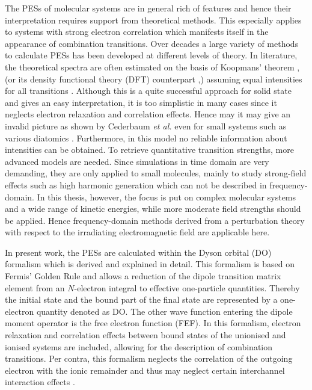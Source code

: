 The PESs of molecular systems are in general rich of features and hence their interpretation requires support from theoretical methods.
This especially applies to systems with strong electron correlation which manifests itself in the appearance of combination transitions.
Over decades a large variety of methods to calculate PESs has been developed at different levels of theory.
In literature, the theoretical spectra are often estimated on the basis of Koopmans' theorem \cite{koopmans}, (or its density functional theory (DFT) counterpart \cite{koopmansDFT},) assuming equal intensities for all transitions \cite{OT-RSH,Koerzd1,Koerzd2,Gao_wopperer}.
Although this is a quite successful approach for solid state \cite{Solid2,Leckey1992} and gives an easy interpretation, it is too simplistic in many cases since it neglects electron relaxation and correlation effects. 
Hence may it may give an invalid picture as shown by Cederbaum \textit{et al.} even for small systems such as various diatomics \cite{2phcederbaum2, cederbaumN2}.
Furthermore, in this model no reliable information about intensities can be obtained.
To retrieve quantitative  transition strengths, more advanced models are needed.
Since simulations in time domain are very demanding, they are only applied to small molecules, mainly to study strong-field effects such as high harmonic generation \cite{H2pDeCleva,as2,hhg, zhangHHG,dromey_HHG} which can not be described in frequency-domain.
In this thesis, however, the focus is put on complex molecular systems and a wide range of kinetic energies, while more moderate field strengths should be applied.
Hence frequency-domain methods derived from a perturbation theory with respect to the irradiating electromagnetic field are applicable here.

In present work, the PESs are calculated within the Dyson orbital (DO) formalism which is derived and explained in detail.
This formalism is based on Fermis' Golden Rule \cite{fgr} and allows a reduction of the dipole transition matrix element from an $N$-electron integral to effective one-particle quantities. %
Thereby the initial state and the bound part of the final state are represented by a one-electron quantity denoted as DO.
The other wave function entering the dipole moment operator is the free electron function (FEF).
In this formalism, electron relaxation and correlation effects between bound states of the unionised and ionised systems are included, allowing for the description of combination transitions.
Per contra, this formalism neglects the correlation of the outgoing electron with the ionic remainder and thus may neglect certain interchannel interaction effects \cite{LiSonntag}.

